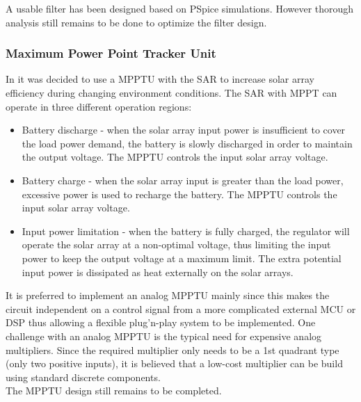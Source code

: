 A usable filter has been designed based on PSpice simulations. However thorough analysis still remains to be done to optimize the filter design.
%
%
\subsubsection{Maximum Power Point Tracker Unit}
\label{sec:MPPTU}
In \cite{PDR} it was decided to use a \ac{MPPTU} with the \ac{SAR} to increase solar array efficiency during changing environment conditions.
%
The \ac{SAR} with \ac{MPPT} can operate in three different operation regions:
%
\begin{itemize}
\item Battery discharge - when the solar array input power is insufficient to cover the load power demand, the battery is slowly discharged in order to maintain the output voltage. The \ac{MPPTU} controls the input solar array voltage.
\item Battery charge - when the solar array input is greater than the load power, excessive power is used to recharge the battery. The \ac{MPPTU} controls the input solar array voltage.
\item Input power limitation - when the battery is fully charged, the regulator will operate the solar array at a non-optimal voltage, thus limiting the input power to keep the output voltage at a maximum limit. The extra potential input power is dissipated as heat externally on the solar arrays.
\end{itemize}
%
It is preferred to implement an analog \ac{MPPTU} mainly since this makes the circuit independent on a control signal from a more complicated external \ac{MCU} or \ac{DSP} thus allowing a flexible plug'n-play system to be implemented. One challenge with an analog \ac{MPPTU} is the typical need for expensive analog multipliers\cite{Liang}. Since the required multiplier only needs to be a 1st quadrant type (only two positive inputs), it is believed that a low-cost multiplier can be build using standard discrete components\cite{Multiplier}.
%
\\[2mm]
The \ac{MPPTU} design still remains to be completed.
%
%
